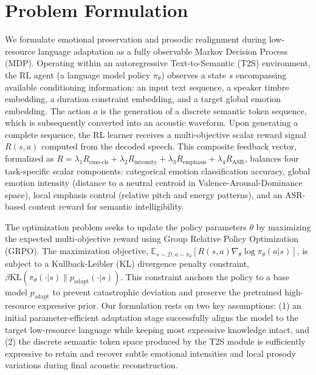 \section{Problem Formulation}

We formulate emotional preservation and prosodic realignment during low-resource language adaptation as a fully observable Markov Decision Process (MDP). Operating within an autoregressive Text-to-Semantic (T2S) environment, the RL agent (a language model policy $\pi_\theta$) observes a state $s$ encompassing available conditioning information: an input text sequence, a speaker timbre embedding, a duration constraint embedding, and a target global emotion embedding. The action $a$ is the generation of a discrete semantic token sequence, which is subsequently converted into an acoustic waveform. Upon generating a complete sequence, the RL learner receives a multi-objective scalar reward signal $R(s, a)$ computed from the decoded speech. This composite feedback vector, formalized as $R = \lambda_1 R_{\text{emo-cls}} + \lambda_2 R_{\text{intensity}} + \lambda_3 R_{\text{emphasis}} + \lambda_4 R_{\text{ASR}}$, balances four task-specific scalar components: categorical emotion classification accuracy, global emotion intensity (distance to a neutral centroid in Valence-Arousal-Dominance space), local emphasis control (relative pitch and energy patterns), and an ASR-based content reward for semantic intelligibility.

The optimization problem seeks to update the policy parameters $\theta$ by maximizing the expected multi-objective reward using Group Relative Policy Optimization (GRPO). The maximization objective, $\mathbb{E}_{s \sim \mathcal{D}, a \sim \pi_\theta} [ R(s, a) \nabla_\theta \log \pi_\theta(a|s) ]$, is subject to a Kullback-Leibler (KL) divergence penalty constraint, $\beta \text{KL}(\pi_\theta(\cdot|s) \| p_{\text{adapt}}(\cdot|s))$. This constraint anchors the policy to a base model $p_{\text{adapt}}$ to prevent catastrophic deviation and preserve the pretrained high-resource expressive prior. Our formulation rests on two key assumptions: (1) an initial parameter-efficient adaptation stage successfully aligns the model to the target low-resource language while keeping most expressive knowledge intact, and (2) the discrete semantic token space produced by the T2S module is sufficiently expressive to retain and recover subtle emotional intensities and local prosody variations during final acoustic reconstruction.
